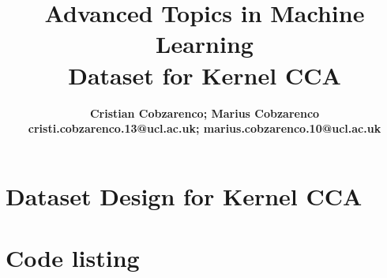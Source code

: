 \documentclass[a4paper, twoside, 12pt, fleqn]{article}
\begin{document}
\title{Advanced Topics in Machine Learning\\Dataset for Kernel CCA}
\author{\bf{Cristian Cobzarenco}; \bf{Marius Cobzarenco} \\
  cristi.cobzarenco.13@ucl.ac.uk; marius.cobzarenco.10@ucl.ac.uk}
\maketitle

\section*{Dataset Design for Kernel CCA}


\newpage
\section*{Code listing}




\end{document}

